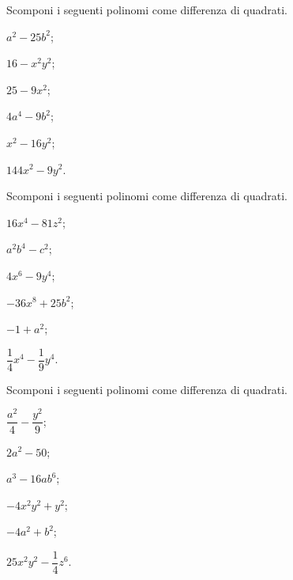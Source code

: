 \begin{esercizio}
\label{ese:13.47}
Scomponi i seguenti polinomi come differenza di quadrati.
\begin{multicols}{3}
\begin{enumeratea}
 \item $a^{2}-25b^{2}$;
 \item $16-x^{2}y^{2}$;
 \item $25-9x^{2}$;
 \item $4a^{4}-9b^{2}$;
 \item $x^{2}-16y^{2}$;
 \item $144x^{2}-9y^{2}$.
\end{enumeratea}
\end{multicols}
\end{esercizio}
\pagebreak
\begin{esercizio}
\label{ese:13.48}
Scomponi i seguenti polinomi come differenza di quadrati.
\begin{multicols}{3}
\begin{enumeratea}
 \item $16x^{4}-81z^{2}$;
 \item $a^{2}b^{4}-c^{2}$;
 \item $4x^{6}-9y^{4}$;
 \item $-36x^{8}+25b^{2}$;
 \item $-1+a^{2}$;
 \item $\dfrac{1}{4}x^{4}-\dfrac{1}{9}y^{4}$.
\end{enumeratea}
\end{multicols}
\end{esercizio}

\begin{esercizio}
\label{ese:13.49}
Scomponi i seguenti polinomi come differenza di quadrati.
\begin{multicols}{3}
\begin{enumeratea}
 \item $\dfrac{a^{2}}{4}-\dfrac{y^{2}}{9}$;
 \item $2a^{2}-50$;
 \item $a^{3}-16{ab}^{6}$;
 \item $-4x^{2}y^{2}+y^{2}$;
 \item $-4a^{2}+b^{2}$;
 \item $25x^{2}y^{2}-\dfrac{1}{4}z^{6}$.
\end{enumeratea}
\end{multicols}
\end{esercizio}

